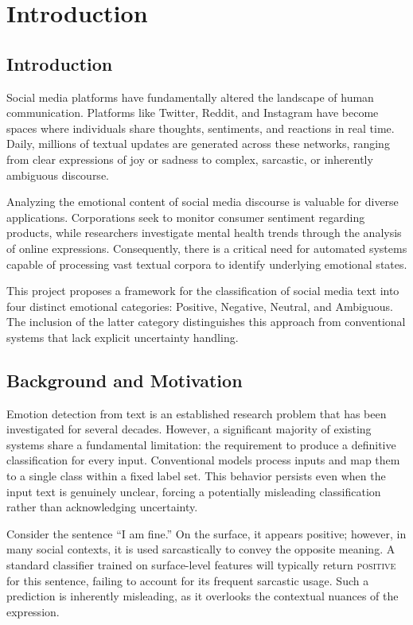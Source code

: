 \chapter{Introduction}

\section{Introduction}

Social media platforms have fundamentally altered the landscape of human communication. Platforms like Twitter, Reddit, and Instagram have become spaces where individuals share thoughts, sentiments, and reactions in real time. Daily, millions of textual updates are generated across these networks, ranging from clear expressions of joy or sadness to complex, sarcastic, or inherently ambiguous discourse.

Analyzing the emotional content of social media discourse is valuable for diverse applications. Corporations seek to monitor consumer sentiment regarding products, while researchers investigate mental health trends through the analysis of online expressions. Consequently, there is a critical need for automated systems capable of processing vast textual corpora to identify underlying emotional states.

This project proposes a framework for the classification of social media text into four distinct emotional categories: Positive, Negative, Neutral, and Ambiguous. The inclusion of the latter category distinguishes this approach from conventional systems that lack explicit uncertainty handling.

\section{Background and Motivation}

Emotion detection from text is an established research problem that has been investigated for several decades. However, a significant majority of existing systems share a fundamental limitation: the requirement to produce a definitive classification for every input. Conventional models process inputs and map them to a single class within a fixed label set. This behavior persists even when the input text is genuinely unclear, forcing a potentially misleading classification rather than acknowledging uncertainty.

Consider the sentence ``I am fine.'' On the surface, it appears positive; however, in many social contexts, it is used sarcastically to convey the opposite meaning. A standard classifier trained on surface-level features will typically return \textsc{positive} for this sentence, failing to account for its frequent sarcastic usage. Such a prediction is inherently misleading, as it overlooks the contextual nuances of the expression.

